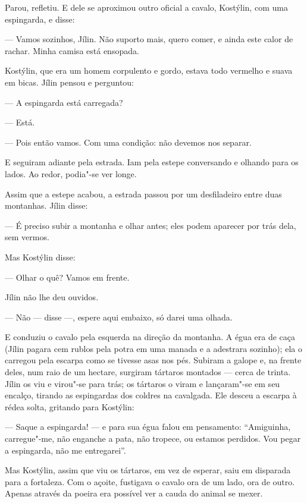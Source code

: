 
Parou, refletiu. E dele se aproximou outro oficial a cavalo, Kostýlin,
com uma espingarda, e disse:

--- Vamos sozinhos, Jílin. Não suporto mais, quero comer, e ainda este
calor de rachar. Minha camisa está ensopada.

Kostýlin, que era um homem corpulento e gordo, estava todo vermelho e
suava em bicas. Jílin pensou e perguntou:

--- A espingarda está carregada?

--- Está.

--- Pois então vamos. Com uma condição: não devemos nos separar.

E seguiram adiante pela estrada. Iam pela estepe conversando e olhando
para os lados. Ao redor, podia"-se ver longe.

Assim que a estepe acabou, a estrada passou por um desfiladeiro entre
duas montanhas. Jílin disse:

--- É preciso subir a montanha e olhar antes; eles podem aparecer por
trás dela, sem vermos.

Mas Kostýlin disse:

--- Olhar o quê? Vamos em frente.

Jílin não lhe deu ouvidos.

--- Não --- disse ---, espere aqui embaixo, só darei uma olhada.

E conduziu o cavalo pela esquerda na direção da montanha. A égua era de
caça (Jílin pagara cem rublos pela potra em uma manada e a adestrara
sozinho); ela o carregou pela escarpa como se tivesse asas nos pés.
Subiram a galope e, na frente deles, num raio de um hectare, surgiram
tártaros montados --- cerca de trinta. Jílin os viu e virou"-se para
trás; os tártaros o viram e lançaram"-se em seu encalço, tirando as
espingardas dos coldres na cavalgada. Ele desceu a escarpa à rédea
solta, gritando para Kostýlin:

--- Saque a espingarda! --- e para sua égua falou em pensamento:
``Amiguinha, carregue"-me, não enganche a pata, não tropece, ou estamos
perdidos. Vou pegar a espingarda, não me entregarei''.

Mas Kostýlin, assim que viu os tártaros, em vez de esperar, saiu em
disparada para a fortaleza. Com o açoite, fustigava o cavalo ora de um
lado, ora de outro. Apenas através da poeira era possível ver a cauda do
animal se mexer.

